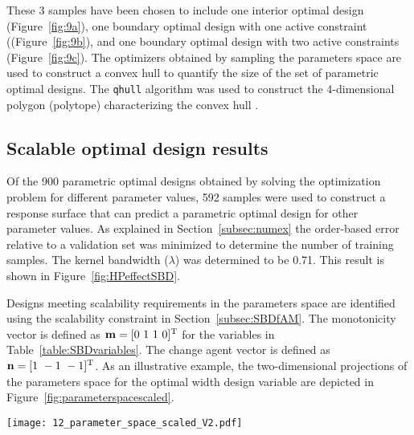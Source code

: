 These 3 samples have been chosen to include one interior optimal design (Figure~\ref{fig:9a}), one boundary optimal design with one active constraint ((Figure~\ref{fig:9b}), and one boundary optimal design with two active constraints (Figure~\ref{fig:9c}).
The optimizers obtained by sampling the parameters space are used to construct a convex hull to quantify the size of the set of parametric optimal designs. The \texttt{qhull} algorithm was used to construct the 4-dimensional polygon (polytope) characterizing the convex hull \cite{Barber2002}.

\subsection{Scalable optimal design results} \label{subsec:scalabledesignspace}

Of the 900 parametric optimal designs obtained by solving the optimization problem for different parameter values, 592 samples were used to construct a response surface that can predict a parametric optimal design for other parameter values. As explained in Section~\ref{subsec:numex} the order-based error relative to a validation set was minimized to determine the number of training samples. The kernel bandwidth ($\lambda$) was determined to be 0.71. This result is shown in Figure~\ref{fig:HPeffectSBD}.

Designs meeting scalability requirements in the parameters space are identified using the scalability constraint in Section~\ref{subsec:SBDfAM}. The monotonicity vector is defined as $\mathbf{m} = [0~1~1~0]^{\text T}$ for the variables in Table~\ref{table:SBDvariables}. The {change agent} vector is defined as $\mathbf{n} = [1~-1~-1]^{\text T}$. As an illustrative example, the two-dimensional projections of the parameters space for the optimal width design variable are depicted in Figure~\ref{fig:parameterspacescaled}.
\begin{figure*}%
	\centering
	\texttt{[image: 12\_parameter\_space\_scaled\_V2.pdf]} %
	\caption{ \label{fig:parameterspacescaled} Projections of the optimal width design variable $\hat{x_3}^{*}$ with non-scalable regions of the parameters space hatched}
\end{figure*}
\begin{figure*}[h!]
	\centering
	 \hspace{0.02\textwidth}%
	\caption{Effect of number of training points and kernel bandwidth on order-based error}
	\label{fig:HPeffectSBD}
\end{figure*}

